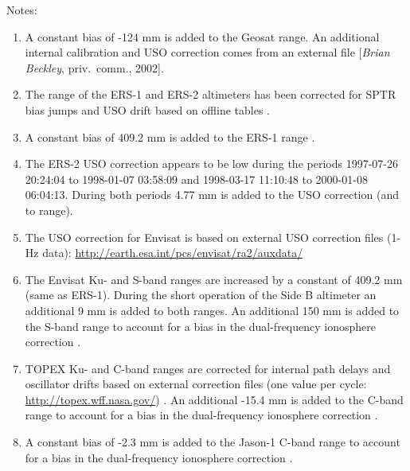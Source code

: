 \documentclass[a4paper,11pt,openany,natbib]{thesis}
\begin{document}
Notes:
\begin{enumerate}
\item A constant bias of -124 mm is added to the Geosat range. An additional internal calibration and USO correction comes from an external file [\emph{Brian Beckley}, priv.\ comm., 2002].
\item The range of the ERS-1 and ERS-2 altimeters has been corrected for SPTR bias jumps and USO drift based on offline tables \citep{martini2000}.
\item A constant bias of 409.2 mm is added to the ERS-1 range \citep{francis1993b,stum1998a}.
\item The ERS-2 USO correction appears to be low during the periods 1997-07-26 20:24:04 to 1998-01-07 03:58:09 and 1998-03-17 11:10:48 to 2000-01-08 06:04:13. During both periods 4.77 mm is added to the USO correction (and to range).
\item The USO correction for Envisat is based on external USO correction files (1-Hz data): \url{http://earth.esa.int/pcs/envisat/ra2/auxdata/}
\item The Envisat Ku- and S-band ranges are increased by a constant of 409.2 mm (same as ERS-1). During the short operation of the Side B altimeter an additional 9 mm is added to both ranges. An additional 150 mm is added to the S-band range to account for a bias in the dual-frequency ionosphere correction \citep{scharroo2010a}.
\item TOPEX Ku- and C-band ranges are corrected for internal path delays and oscillator drifts based on external correction files (one value per cycle: \url{http://topex.wff.nasa.gov/}) \citep{hayne1994}. An additional -15.4 mm is added to the C-band range to account for a bias in the dual-frequency ionosphere correction \citep{scharroo2010a}.
\item A constant bias of -2.3 mm is added to the Jason-1 C-band range to account for a bias in the dual-frequency ionosphere correction \citep{scharroo2010a}.
\end{enumerate}
\end{document}
